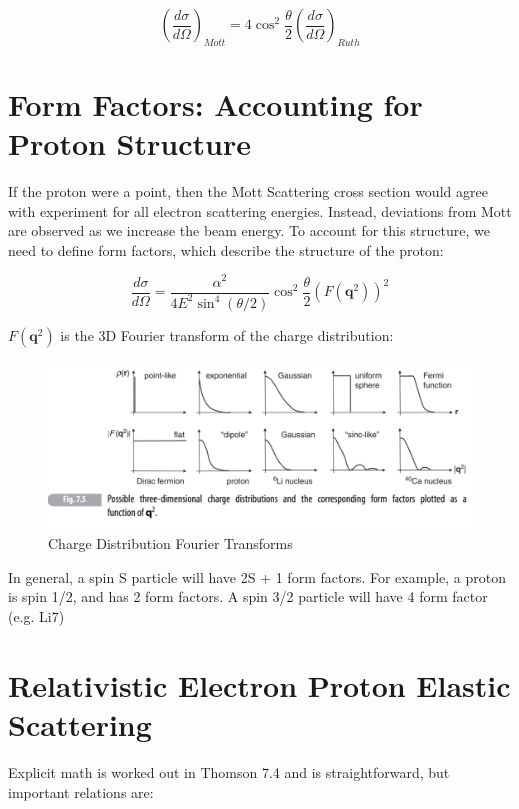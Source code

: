             \begin{equation}
                (\frac{d\sigma}{d\Omega})_{Mott} = 4\cos^2{\frac{\theta}{2}}(\frac{d\sigma}{d\Omega})_{Ruth}
            \end{equation}
    \section{Form Factors: Accounting for Proton Structure}
        \indent If the proton were a point, then the Mott Scattering cross section would agree with experiment for all electron scattering energies. Instead, deviations from Mott are observed as we increase the beam energy. To account for this structure, we need to define form factors, which describe the structure of the proton:
        
        \begin{equation}
            \frac{d\sigma}{d\Omega} = \frac{\alpha^2}{4E^2\sin^4{(\theta/2)}}\cos^2{\frac{\theta}{2}}(F(\textbf{q}^2))^2
        \end{equation}
        
        
        $F(\textbf{q}^2)$ is the 3D Fourier transform of the charge distribution: 
        
        \begin{figure}[H]
            \centering
            \includegraphics[width=14cm]{NuclearPhysics/modules/lepton-scattering/pics/elastic-ep/charge-dist.PNG}
            \caption{Charge Distribution Fourier Transforms}
        \end{figure}
        
        In general, a spin S particle will have 2S + 1 form factors. For example, a proton is spin 1/2, and has 2 form factors. A spin 3/2 particle will have 4 form factor (e.g. Li7) 
        
    \section{Relativistic Electron Proton Elastic Scattering}
        \indent Explicit math is worked out in Thomson 7.4 and is straightforward, but important relations are:
        
